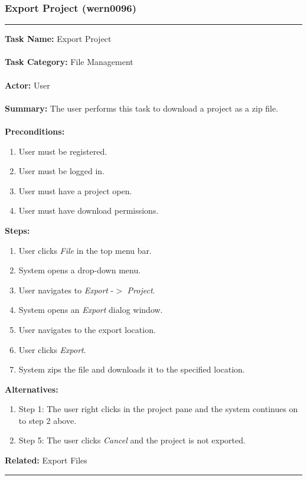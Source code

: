 \documentclass[11pt]{report}
\begin{document}
\subsubsection{Export Project (wern0096)}
\vspace{2pt}
\hrule
\vspace{8pt}
	\noindent\textbf{Task Name:} Export Project \\ \\
	\textbf{Task Category:} File Management \\ \\
	\textbf{Actor:} User \\ \\
	\textbf{Summary:} The user performs this task to download a project as a zip file. \\ \\
	\textbf{Preconditions:} 
	\begin{enumerate}
		\item User must be registered.
		\item User must be logged in.
		\item User must have a project open.
		\item User must have download permissions.
	\end{enumerate}
	\textbf{Steps:}
	\begin{enumerate}
		\item User clicks \textit{File} in the top menu bar.
		\item System opens a drop-down menu.
		\item User navigates to \textit{Export} -$>$ \textit{Project}.
		\item System opens an \textit{Export} dialog window.
		\item User navigates to the export location.
		\item User clicks \textit{Export}.
		\item System zips the file and downloads it to the specified location.
	\end{enumerate}
	\textbf{Alternatives:} 
	\begin{enumerate}
		\item Step 1: The user right clicks in the project pane and the system continues on to step 2 above.
		\item Step 5: The user clicks \textit{Cancel} and the project is not exported.
	\end{enumerate}
	\textbf{Related:} Export Files
\vspace{8pt}
\hrule
\newpage
\end{document}
